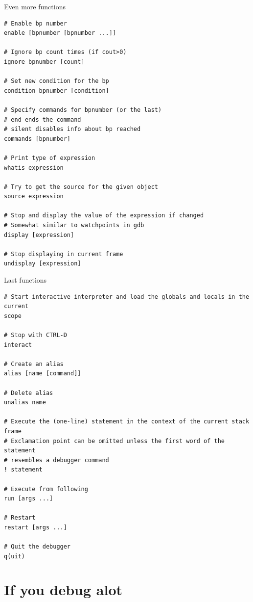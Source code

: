 \documentclass[
    size=20pt,
    style=sailor,
    display=slides,
    paper=smartboard,
    orient=landscape,
]{powerdot}
\begin{document}
\begin{slide}[method=file]{Even more functions}
\begin{verbatim}
# Enable bp number
enable [bpnumber [bpnumber ...]]

# Ignore bp count times (if cout>0)
ignore bpnumber [count]

# Set new condition for the bp
condition bpnumber [condition]

# Specify commands for bpnumber (or the last)
# end ends the command
# silent disables info about bp reached
commands [bpnumber]

# Print type of expression
whatis expression

# Try to get the source for the given object
source expression

# Stop and display the value of the expression if changed
# Somewhat similar to watchpoints in gdb
display [expression]

# Stop displaying in current frame
undisplay [expression]
\end{verbatim}
\end{slide}


\begin{slide}[method=file]{Last functions}
\begin{verbatim}
# Start interactive interpreter and load the globals and locals in the current 
scope

# Stop with CTRL-D
interact

# Create an alias
alias [name [command]]

# Delete alias
unalias name

# Execute the (one-line) statement in the context of the current stack frame
# Exclamation point can be omitted unless the first word of the statement 
# resembles a debugger command
! statement

# Execute from following
run [args ...]

# Restart
restart [args ...]

# Quit the debugger
q(uit)
\end{verbatim}
\end{slide}

\section{If you debug alot}
\end{document}
